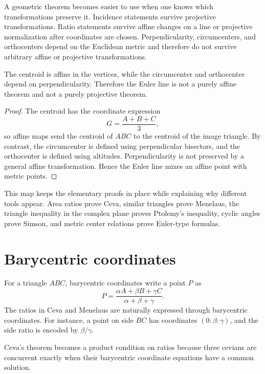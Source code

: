 \begin{remark}
A geometric theorem becomes easier to use when one knows which transformations preserve it.  Incidence statements survive projective transformations.  Ratio statements survive affine changes on a line or projective normalization after coordinates are chosen.  Perpendicularity, circumcenters, and orthocenters depend on the Euclidean metric and therefore do not survive arbitrary affine or projective transformations.
\end{remark}

\begin{proposition}
The centroid is affine in the vertices, while the circumcenter and orthocenter depend on perpendicularity.  Therefore the Euler line is not a purely affine theorem and not a purely projective theorem.
\end{proposition}

\begin{proof}
The centroid has the coordinate expression
\[
  G=\frac{A+B+C}{3},
\]
so affine maps send the centroid of \(ABC\) to the centroid of the image triangle.  By contrast, the circumcenter is defined using perpendicular bisectors, and the orthocenter is defined using altitudes.  Perpendicularity is not preserved by a general affine transformation.  Hence the Euler line mixes an affine point with metric points.
\end{proof}

This map keeps the elementary proofs in place while explaining why different tools appear.  Area ratios prove Ceva, similar triangles prove Menelaus, the triangle inequality in the complex plane proves Ptolemy's inequality, cyclic angles prove Simson, and metric center relations prove Euler-type formulas.

\section{Barycentric coordinates}

For a triangle $ABC$, barycentric coordinates write a point $P$ as
\[
  P=\frac{\alpha A+\beta B+\gamma C}{\alpha+\beta+\gamma}.
\]
The ratios in Ceva and Menelaus are naturally expressed through barycentric coordinates.  For instance, a point on side $BC$ has coordinates $(0:\beta:\gamma)$, and the side ratio is encoded by $\beta/\gamma$.

Ceva's theorem becomes a product condition on ratios because three cevians are concurrent exactly when their barycentric coordinate equations have a common solution.

